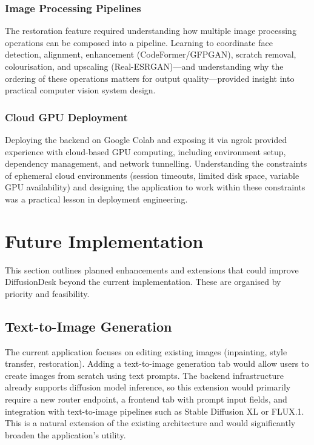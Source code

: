 \documentclass[12pt,a4paper]{report}
\begin{document}
\subsubsection{Image Processing Pipelines}

The restoration feature required understanding how multiple image processing operations can be composed into a pipeline. Learning to coordinate face detection, alignment, enhancement (CodeFormer/GFPGAN), scratch removal, colourisation, and upscaling (Real-ESRGAN)---and understanding why the ordering of these operations matters for output quality---provided insight into practical computer vision system design.

\subsubsection{Cloud GPU Deployment}

Deploying the backend on Google Colab and exposing it via ngrok provided experience with cloud-based GPU computing, including environment setup, dependency management, and network tunnelling. Understanding the constraints of ephemeral cloud environments (session timeouts, limited disk space, variable GPU availability) and designing the application to work within these constraints was a practical lesson in deployment engineering.

\newpage

\section{Future Implementation}

This section outlines planned enhancements and extensions that could improve DiffusionDesk beyond the current implementation. These are organised by priority and feasibility.

\subsection{Text-to-Image Generation}

The current application focuses on editing existing images (inpainting, style transfer, restoration). Adding a text-to-image generation tab would allow users to create images from scratch using text prompts. The backend infrastructure already supports diffusion model inference, so this extension would primarily require a new router endpoint, a frontend tab with prompt input fields, and integration with text-to-image pipelines such as Stable Diffusion XL or FLUX.1. This is a natural extension of the existing architecture and would significantly broaden the application's utility.
\end{document}
